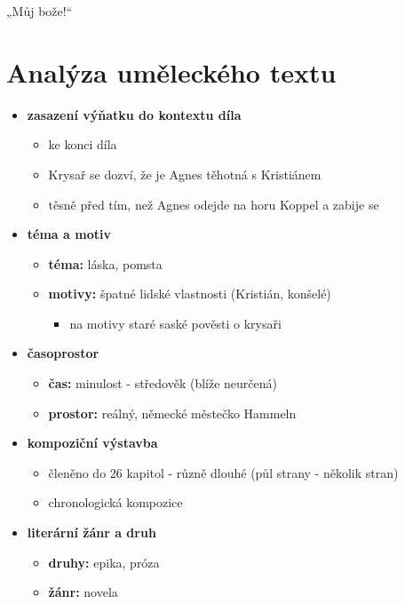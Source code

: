 \documentclass[11pt]{article}
\begin{document}
    „Můj bože!“ 
    \section*{Analýza uměleckého textu}
    \begin{itemize}
        \item\textbf{zasazení výňatku do kontextu díla}
        \begin{itemize}
            \item ke konci díla
            \item Krysař se dozví, že je Agnes těhotná s Kristiánem 
            \item těsně před tím, než Agnes odejde na horu Koppel a zabije se
        \end{itemize}
        \item\textbf{téma a motiv}
        \begin{itemize}
            \item\textbf{téma: }láska, pomsta
            \item\textbf{motivy: }špatné lidské vlastnosti (Kristián, konšelé)
            \begin{itemize}
                \item na motivy staré saské pověsti o krysaři
            \end{itemize}
        \end{itemize}
        \item\textbf{časoprostor}
        \begin{itemize}
            \item \textbf{čas: }minulost - středověk (blíže neurčená)
            \item \textbf{prostor: }reálný, německé městečko Hammeln
        \end{itemize}
        \item\textbf{kompoziční výstavba}
        \begin{itemize}
            \item členěno do 26 kapitol - různě dlouhé (půl strany - několik stran)
            \item chronologická kompozice
        \end{itemize}
        \item\textbf{literární žánr a druh}
        \begin{itemize}
            \item \textbf{druhy: }epika, próza
            \item \textbf{žánr: }novela
        \end{itemize}

\end{itemize}
\end{document}
